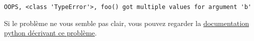     \begin{Verbatim}[commandchars=\\\{\},frame=single,framerule=0.3mm,rulecolor=\color{cellframecolor}]
OOPS, <class 'TypeError'>, foo() got multiple values for argument 'b'
\end{Verbatim}

    Si le problème ne vous semble pas clair, vous pouvez regarder la
\href{https://docs.python.org/3/reference/expressions.html\#calls}{documentation
python décrivant ce problème}.


    
    
    
